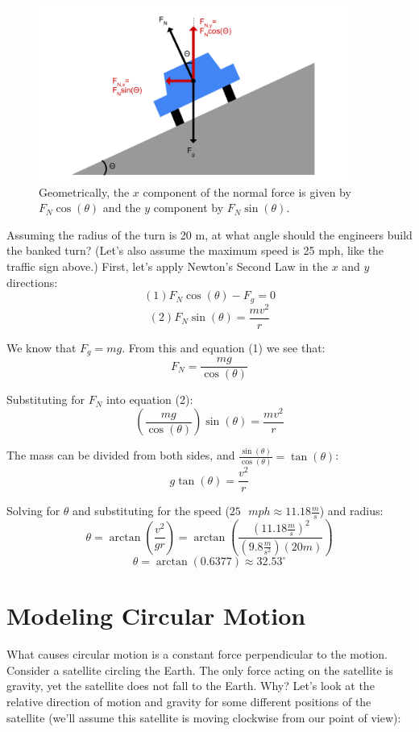 \begin{figure}[htbp]
\centering
\includegraphics[width=4in]{banked_component.png}
\caption{Geometrically, the $x$ component of the normal force is given by $F_N \cos{\left( \theta \right)}$ and the $y$ component by $F_N \sin{ \left( \theta \right)}$.}
\label{fig:banked_component}
\end{figure}

Assuming the radius of the turn is 20 m, at what angle should the engineers build the banked turn? (Let's also assume the maximum speed is 25 mph, like the traffic sign above.) First, let's apply Newton's Second Law in the $x$ and $y$ directions:
$$\left( 1 \right) F_N \cos{ \left( \theta \right) } - F_g = 0$$
$$\left( 2 \right) F_N \sin{ \left( \theta \right) } = \frac{mv^2}{r}$$

We know that $F_g = mg$. From this and equation (1) we see that:
$$F_N = \frac{mg}{\cos{ \left( \theta \right)}}$$

Substituting for $F_N$ into equation (2):
$$\left( \frac{mg}{\cos{ \left( \theta \right)}} \right) \sin{ \left( \theta \right)} = \frac{mv^2}{r}$$

The mass can be divided from both sides, and $\frac{\sin{ \left( \theta \right)}}{\cos{ \left( \theta \right)}} = \tan{ \left( \theta \right)}$:
$$g \tan{ \left( \theta \right)} = \frac{v^2}{r}$$

Solving for $\theta$ and substituting for the speed ($25 \text{ }mph \approx 11.18 \frac{m}{s}$) and radius:
$$\theta = \arctan{ \left( \frac{v^2}{gr} \right)} = \arctan{ \left( \frac{\left( 11.18 \frac{m}{s} \right)^2}{\left( 9.8 \frac{m}{s^2} \right) \left( 20 m \right)} \right)}$$
$$\theta = \arctan{ \left( 0.6377 \right) } \approx 32.53 ^{\circ}$$


\section{Modeling Circular Motion}
What causes circular motion is a constant force perpendicular to the motion. Consider a satellite circling the Earth. The only force acting on the satellite is gravity, yet the satellite does not fall to the Earth. Why? Let's look at the relative direction of motion and gravity for some different positions of the satellite (we'll assume this satellite is moving clockwise from our point of view):

